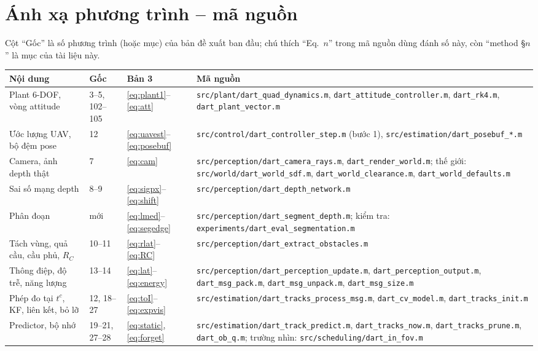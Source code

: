 \documentclass[11pt,a4paper]{article}
\numberwithin{equation}{section}
\newcommand{\code}[1]{\texttt{\small #1}}
\theoremstyle{definition}
\theoremstyle{plain}
\theoremstyle{remark}
\begin{document}
\section{Ánh xạ phương trình -- mã nguồn}
\label{app:map}
Cột ``Gốc'' là số phương trình (hoặc mục) của bản đề xuất ban đầu; chú thích ``Eq.~$n$'' trong mã nguồn dùng đánh số này, còn ``method \S$n$'' là mục của tài liệu này.
{\footnotesize
\begin{longtable}{@{}p{3.6cm}p{1.7cm}p{2.2cm}>{\raggedright\arraybackslash}p{7.5cm}@{}}
\toprule
Nội dung & Gốc & Bản 3 & Mã nguồn \\ \midrule\endhead
Plant 6-DOF, vòng attitude & 3--5, 102--105 & \eqref{eq:plant1}--\eqref{eq:att} & \code{src/plant/dart\_quad\_dynamics.m}, \code{dart\_attitude\_controller.m}, \code{dart\_rk4.m}, \code{dart\_plant\_vector.m} \\
Ước lượng UAV, bộ đệm pose & 12 & \eqref{eq:uavest}--\eqref{eq:posebuf} & \code{src/control/dart\_controller\_step.m} (bước 1), \code{src/estimation/dart\_posebuf\_*.m} \\
Camera, ảnh depth thật & 7 & \eqref{eq:cam} & \code{src/perception/dart\_camera\_rays.m}, \code{dart\_render\_world.m}; thế giới: \code{src/world/dart\_world\_sdf.m}, \code{dart\_world\_clearance.m}, \code{dart\_world\_defaults.m} \\
Sai số mạng depth & 8--9 & \eqref{eq:sigpx}--\eqref{eq:shift} & \code{src/perception/dart\_depth\_network.m} \\
Phân đoạn & mới & \eqref{eq:lmed}--\eqref{eq:segedge} & \code{src/perception/dart\_segment\_depth.m}; kiểm tra: \code{experiments/dart\_eval\_segmentation.m} \\
Tách vùng, quả cầu, cầu phủ, $R_C$ & 10--11 & \eqref{eq:rlat}--\eqref{eq:RC} & \code{src/perception/dart\_extract\_obstacles.m} \\
Thông điệp, độ trễ, năng lượng & 13--14 & \eqref{eq:lat}--\eqref{eq:energy} & \code{src/perception/dart\_perception\_update.m}, \code{dart\_perception\_output.m}, \code{dart\_msg\_pack.m}, \code{dart\_msg\_unpack.m}, \code{dart\_msg\_size.m} \\
Phép đo tại $t^c$, KF, liên kết, bỏ lỡ & 12, 18--27 & \eqref{eq:toI}--\eqref{eq:expvis} & \code{src/estimation/dart\_tracks\_process\_msg.m}, \code{dart\_cv\_model.m}, \code{dart\_tracks\_init.m} \\
Predictor, bộ nhớ & 19--21, 27--28 & \eqref{eq:static}, \eqref{eq:forget} & \code{src/estimation/dart\_track\_predict.m}, \code{dart\_tracks\_now.m}, \code{dart\_tracks\_prune.m}, \code{dart\_ob\_q.m}; trường nhìn: \code{src/scheduling/dart\_in\_fov.m} \\

\end{longtable}}
\end{document}
